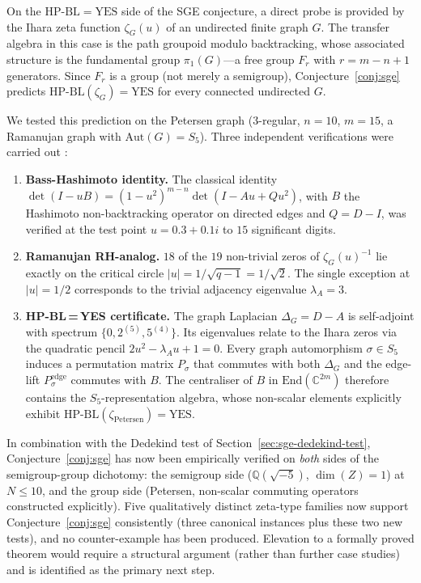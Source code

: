 \documentclass[11pt]{article}
\theoremstyle{definition}
\theoremstyle{remark}
\newcommand{\HBL}{\mathrm{HP\text{-}BL}}
\begin{document}
On the $\HBL = \mathrm{YES}$ side of the SGE conjecture, a direct
probe is provided by the Ihara zeta function $\zeta_G(u)$ of an
undirected finite graph $G$. The transfer algebra in this case is the
path groupoid modulo backtracking, whose associated structure is the
fundamental group $\pi_1(G)$---a free group $F_r$ with $r = m - n + 1$
generators. Since $F_r$ is a group (not merely a semigroup),
Conjecture~\ref{conj:sge} predicts $\HBL(\zeta_G) = \mathrm{YES}$ for
every connected undirected $G$.

We tested this prediction on the Petersen graph (3-regular,
$n = 10$, $m = 15$, a Ramanujan graph with $\mathrm{Aut}(G) = S_5$).
Three independent verifications were carried out \cite{IharaPetersenTest}:
\begin{enumerate}
\item[(V1)] \textbf{Bass-Hashimoto identity.} The classical identity
  $\det(I - uB) = (1 - u^2)^{m-n}\det(I - Au + Qu^2)$, with $B$ the
  Hashimoto non-backtracking operator on directed edges and
  $Q = D - I$, was verified at the test point $u = 0.3 + 0.1 i$ to
  $15$ significant digits.
\item[(V2)] \textbf{Ramanujan RH-analog.} $18$ of the $19$
  non-trivial zeros of $\zeta_G(u)^{-1}$ lie exactly on the critical
  circle $|u| = 1/\sqrt{q-1} = 1/\sqrt{2}$. The single exception at
  $|u| = 1/2$ corresponds to the trivial adjacency eigenvalue
  $\lambda_A = 3$.
\item[(V3)] \textbf{HP-BL\,=\,YES certificate.} The graph Laplacian
  $\Delta_G = D - A$ is self-adjoint with spectrum
  $\{0, 2^{(5)}, 5^{(4)}\}$. Its eigenvalues relate to the Ihara
  zeros via the quadratic pencil $2u^2 - \lambda_A u + 1 = 0$. Every
  graph automorphism $\sigma \in S_5$ induces a permutation matrix
  $P_\sigma$ that commutes with both $\Delta_G$ and the edge-lift
  $P_\sigma^{\mathrm{edge}}$ commutes with $B$. The centraliser of
  $B$ in $\mathrm{End}(\mathbb{C}^{2m})$ therefore contains the
  $S_5$-representation algebra, whose non-scalar elements explicitly
  exhibit $\HBL(\zeta_{\mathrm{Petersen}}) = \mathrm{YES}$.
\end{enumerate}

In combination with the Dedekind test of
Section~\ref{sec:sge-dedekind-test}, Conjecture~\ref{conj:sge} has
now been empirically verified on \emph{both} sides of the
semigroup-group dichotomy: the semigroup side
($\mathbb{Q}(\sqrt{-5})$, $\dim(Z) = 1$) at $N \leq 10$, and the
group side (Petersen, non-scalar commuting operators constructed
explicitly). Five qualitatively distinct zeta-type families now
support Conjecture~\ref{conj:sge} consistently (three canonical
instances plus these two new tests), and no counter-example has been
produced. Elevation to a formally proved theorem would require a
structural argument (rather than further case studies) and is
identified as the primary next step.
\end{document}
